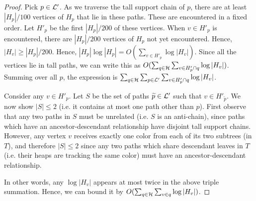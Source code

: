 \documentclass[11pt]{article}
\theoremstyle{definition}
\newcommand{\cH}{{\cal H}}
\newcommand{\cL}{{\cal L}}
\newcommand{\Lem}[1]{\hyperref[lem:#1]{Lemma~\ref*{lem:#1}}} %
\begin{document}
\begin{proof} 
Pick $p \in \cL'$. 
%
%
As we traverse the tall support chain of $p$, there
are at least $|H_p|/100$ vertices of $H_p$ that lie in these paths. These are encountered in
a fixed order. Let $H'_p$ be the first $|H_p|/200$ of these vertices. When $v \in H'_p$
is encountered, there are $|H_p|/200$ vertices of $H_p$ not yet encountered. Hence,
$|H_v| \geq |H_p|/200$. Hence, $|H_p|\log |H_p| = O(\sum_{v \in H'_p} \log |H_v|)$.
Since all the vertices lie in tall paths,
we can write this as $O(\sum_{q \in \cH} \sum_{v \in H'_p \cap q} \log |H_v|)$.
Summing over all $p$, the expression is $\sum_{q \in \cH} \sum_{p \in \cL'} \sum_{v \in H'_p \cap q} \log |H_v|$.

Consider any $v \in H'_p$.  Let $S$ be the set of paths $\widetilde{p}\in \cL'$ such that 
$v\in H'_{\widetilde{p}}$.  We now show $|S|\leq 2$ (i.e. it contains at most one path other than $p$).
First observe that any two paths in $S$ must be unrelated (i.e. $S$ is an anti-chain), 
since paths which have an ancestor-descendant relationship have disjoint tall support chains.  
However, any vertex $v$ receives exactly one color from each of its two subtrees (in $T$), and therefore $|S|\leq 2$ since any two 
paths which share descendant leaves in $T$ (i.e. their heaps are tracking the same color) must have an ancestor-descendant relationship.

In other words, any $\log |H_v|$ appears at most twice in the above triple summation.
Hence, we can bound it by $O(\sum_{q \in \cH} \sum_{v \in q} \log |H_v|)$.
%
%
\end{proof}
\end{document}
